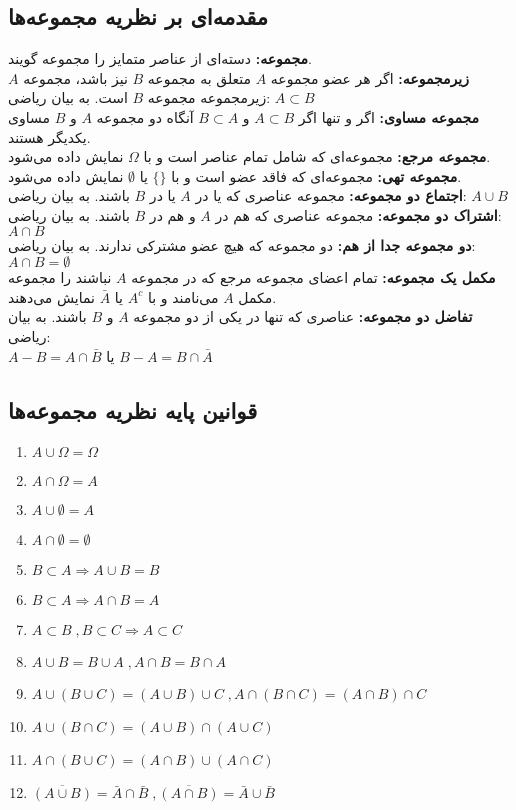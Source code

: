 \documentclass[12pt]{article}
\begin{document}
	\subsection*{مقدمه‌ای بر نظریه مجموعه‌ها}
	\textbf{مجموعه:}
	دسته‌ای از عناصر متمایز را مجموعه گویند.\\
	\textbf{زیرمجموعه:} 
	اگر هر عضو مجموعه $A$ متعلق به مجموعه $B$ نیز باشد، مجموعه $A$ زیرمجموعه مجموعه $B$ است. به بیان ریاضی: $A\subset B$\\
	\textbf{مجموعه مساوی:} 
	اگر و تنها اگر $A\subset B$ و $B\subset A$ آنگاه دو مجموعه $A$ و $B$ مساوی یکدیگر هستند. \\
	\textbf{مجموعه مرجع:} 
	مجموعه‌ای که شامل تمام عناصر است و با $\Omega$ نمایش داده می‌شود. \\
	\textbf{مجموعه تهی:} 
	مجموعه‌ای که فاقد عضو است و با $\{\}$ یا $\emptyset$ نمایش داده می‌شود. \\
	\textbf{اجتماع دو مجموعه:}
	مجموعه عناصری که یا در $A$ یا در $B$ باشند. به بیان ریاضی: $A\cup B$\\
	\textbf{اشتراک دو مجموعه:}
	مجموعه عناصری که هم در $A$ و هم در $B$ باشند. به بیان ریاضی: $A\cap B$\\
	\textbf{دو مجموعه جدا از هم:}
	دو مجموعه که هیچ عضو مشترکی ندارند. به بیان ریاضی: $A\cap B = \emptyset$\\
	\textbf{مکمل یک مجموعه:}
	تمام اعضای مجموعه مرجع که در مجموعه $A$ نباشند را مجموعه مکمل $A$ می‌نامند و با $A^c$ یا $\bar{A}$ نمایش می‌دهند. \\
	\textbf{تفاضل دو مجموعه:}
	عناصری که تنها در یکی از دو مجموعه $A$ و $B$ باشند. به بیان ریاضی:\\ 
	$A-B=A\cap \bar{B}$ یا $B-A=B\cap \bar{A}$
	\subsection*{قوانین پایه نظریه مجموعه‌ها}
	\begin{enumerate}
		\item $A\cup \Omega=\Omega$
		\item $A\cap \Omega=A$
		\item $A\cup \emptyset=A$
		\item $A\cap \emptyset=\emptyset$
		\item $B\subset A \Rightarrow A\cup B=B$
		\item $B\subset A \Rightarrow A\cap B=A$
		\item $A\subset B \; ,B\subset C \Rightarrow A\subset C$
		\item $A\cup B=B\cup A \;, A\cap B=B\cap A$
		\item $A\cup (B\cup C)=(A\cup B)\cup C \;, A\cap (B\cap C)=(A\cap B)\cap C$
		\item $A\cup (B\cap C)=(A\cup B)\cap (A\cup C)$
		\item $A\cap (B\cup C)=(A\cap B)\cup (A\cap C)$
		\item $\overline{(A\cup B)}=\bar{A}\cap \bar{B} \;, \overline{(A\cap B)}=\bar{A}\cup \bar{B}$
		
	\end{enumerate}
	
\end{document}
